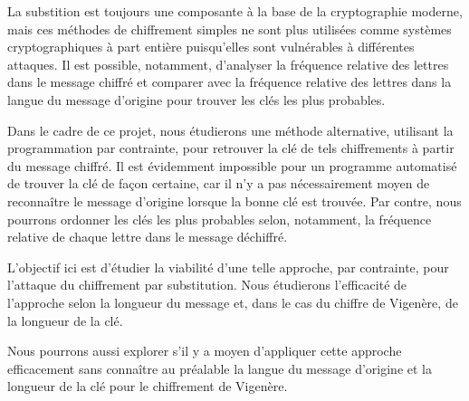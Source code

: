 \documentclass[12pt]{article}
\begin{document}
    La substition est toujours une composante à la base de la cryptographie moderne, mais ces méthodes de chiffrement simples ne sont plus utilisées comme systèmes cryptographiques à part entière puisqu'elles sont vulnérables à différentes attaques.
    Il est possible, notamment, d'analyser la fréquence relative des lettres dans le message chiffré et comparer avec la fréquence relative des lettres dans la langue du message d'origine pour trouver les clés les plus probables.

    Dans le cadre de ce projet, nous étudierons une méthode alternative, utilisant la programmation par contrainte, pour retrouver la clé de tels chiffrements à partir du message chiffré.
    Il est évidemment impossible pour un programme automatisé de trouver la clé de façon certaine, car il n'y a pas nécessairement moyen de reconnaître le message d'origine lorsque la bonne clé est trouvée.
    Par contre, nous pourrons ordonner les clés les plus probables selon, notamment, la fréquence relative de chaque lettre dans le message déchiffré.

    L'objectif ici est d'étudier la viabilité d'une telle approche, par contrainte, pour l'attaque du chiffrement par substitution.
    Nous étudierons l'efficacité de l'approche selon la longueur du message et, dans le cas du chiffre de Vigenère, de la longueur de la clé.

    Nous pourrons aussi explorer s'il y a moyen d'appliquer cette approche efficacement sans connaître au préalable la langue du message d'origine et la longueur de la clé pour le chiffrement de Vigenère.
\end{document}

